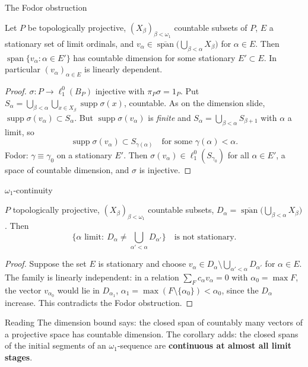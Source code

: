 \documentclass[10pt,aspectratio=169]{beamer}
\newcommand{\lo}[1]{\ell_1^0(#1)}
\newcommand{\supp}{\operatorname{supp}}
\newcommand{\Lin}{\operatorname{span}}
\begin{document}
\begin{frame}{The Fodor obstruction}
  \begin{theorem}
    Let $P$ be topologically projective, ${(X_\beta)}_{\beta<\omega_1}$ countable
    subsets of $P$, $E$ a stationary set of limit ordinals, and
    $v_\alpha\in\overline{\Lin}\bigl(\bigcup_{\beta<\alpha}X_\beta\bigr)$ for
    $\alpha\in E$. Then $\Lin\{v_\alpha:\alpha\in E'\}$ has countable dimension
    for some stationary $E'\subset E$. In particular ${(v_\alpha)}_{\alpha\in E}$
    is linearly dependent.
  \end{theorem}
  \begin{proof}
    $\sigma\colon P\to\lo{B_P}$ injective with $\pi_P\sigma=1_P$. Put
    $S_\alpha=\bigcup_{\beta<\alpha}\bigcup_{x\in X_\beta}\supp\sigma(x)$,
    countable. As on the dimension slide, $\supp\sigma(v_\alpha)\subset S_\alpha$.
    But $\supp\sigma(v_\alpha)$ is \emph{finite} and
    $S_\alpha=\bigcup_{\beta<\alpha}S_{\beta+1}$ with $\alpha$ a limit, so
    \[
      \supp\sigma(v_\alpha)\subset S_{\gamma(\alpha)}\quad\text{for some }\gamma(\alpha)<\alpha .
    \]
    Fodor: $\gamma\equiv\gamma_0$ on a stationary $E'$. Then
    $\sigma(v_\alpha)\in\lo{S_{\gamma_0}}$ for all $\alpha\in E'$, a space of
    countable dimension, and $\sigma$ is injective.
  \end{proof}
\end{frame}

\begin{frame}{$\omega_1$-continuity}
  \begin{corollary}
    $P$ topologically projective, ${(X_\beta)}_{\beta<\omega_1}$ countable subsets,
    $D_\alpha=\overline{\Lin}\bigl(\bigcup_{\beta<\alpha}X_\beta\bigr)$. Then
    \[
      \bigl\{\alpha\text{ limit}:\ D_\alpha\ne\textstyle\bigcup_{\alpha'<\alpha}D_{\alpha'}\bigr\}
      \quad\text{is not stationary.}
    \]
  \end{corollary}
  \begin{proof}
    Suppose the set $E$ is stationary and choose
    $v_\alpha\in D_\alpha\setminus\bigcup_{\alpha'<\alpha}D_{\alpha'}$ for $\alpha\in E$.
    The family is linearly independent: in a relation $\sum_Fc_\alpha v_\alpha=0$
    with $\alpha_0=\max F$, the vector $v_{\alpha_0}$ would lie in
    $D_{\alpha_1}$, $\alpha_1=\max(F\setminus\{\alpha_0\})<\alpha_0$, since the
    $D_\alpha$ increase. This contradicts the Fodor obstruction.
  \end{proof}
  \begin{block}{Reading}
    The dimension bound says: the closed span of countably many vectors of a
    projective space has countable dimension. The corollary adds: the closed
    spans of the initial segments of an $\omega_1$-sequence are
    \textbf{continuous at almost all limit stages}.
  \end{block}
\end{frame}
\end{document}
